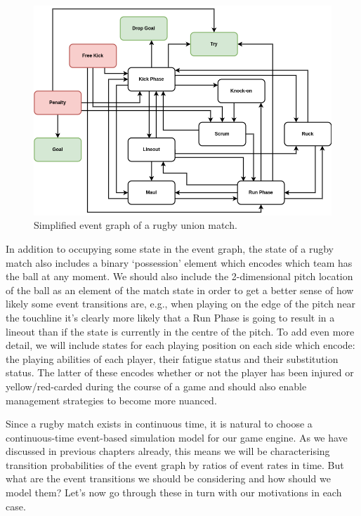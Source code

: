 \begin{figure}[h]
\includegraphics[width=14cm]{images/trywizard-event-graph.drawio.png}
\caption{Simplified event graph of a rugby union match.}
\label{fig:event-graph}
\end{figure}

In addition to occupying some state in the event graph, the state of a rugby match also includes a binary `possession' element which encodes which team has the ball at any moment. We should also include the 2-dimensional pitch location of the ball as an element of the match state in order to get a better sense of how likely some event transitions are, e.g., when playing on the edge of the pitch near the touchline it's clearly more likely that a Run Phase is going to result in a lineout than if the state is currently in the centre of the pitch. To add even more detail, we will include states for each playing position on each side which encode: the playing abilities of each player, their fatigue status and their substitution status. The latter of these encodes whether or not the player has been injured or yellow/red-carded during the course of a game and should also enable management strategies to become more nuanced.

Since a rugby match exists in continuous time, it is natural to choose a continuous-time event-based simulation model for our game engine. As we have discussed in previous chapters already, this means we will be characterising transition probabilities of the event graph by ratios of event rates in time. But what are the event transitions we should be considering and how should we model them? Let's now go through these in turn with our motivations in each case.

